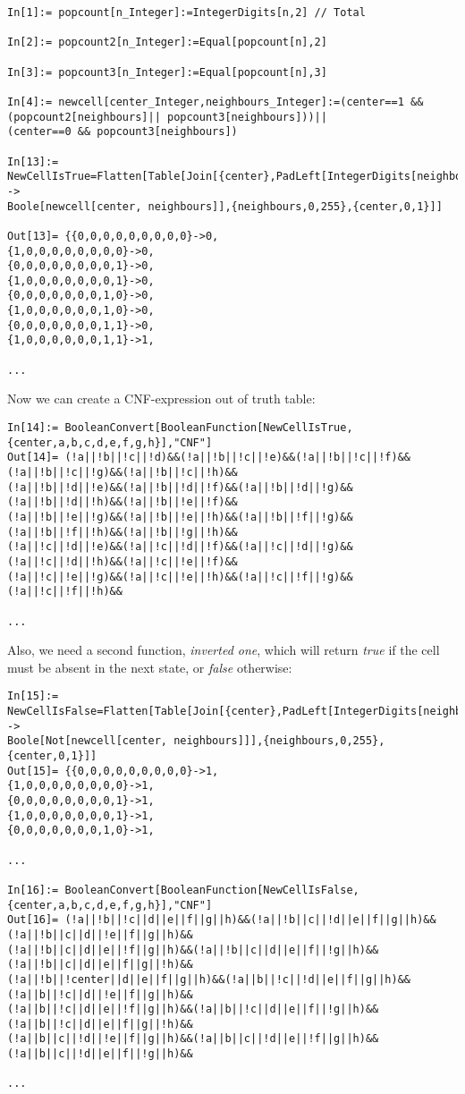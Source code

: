 \begin{lstlisting}
In[1]:= popcount[n_Integer]:=IntegerDigits[n,2] // Total

In[2]:= popcount2[n_Integer]:=Equal[popcount[n],2]

In[3]:= popcount3[n_Integer]:=Equal[popcount[n],3]

In[4]:= newcell[center_Integer,neighbours_Integer]:=(center==1 && (popcount2[neighbours]|| popcount3[neighbours]))||
(center==0 && popcount3[neighbours])

In[13]:= NewCellIsTrue=Flatten[Table[Join[{center},PadLeft[IntegerDigits[neighbours,2],8]] ->
Boole[newcell[center, neighbours]],{neighbours,0,255},{center,0,1}]]

Out[13]= {{0,0,0,0,0,0,0,0,0}->0,
{1,0,0,0,0,0,0,0,0}->0,
{0,0,0,0,0,0,0,0,1}->0,
{1,0,0,0,0,0,0,0,1}->0,
{0,0,0,0,0,0,0,1,0}->0,
{1,0,0,0,0,0,0,1,0}->0,
{0,0,0,0,0,0,0,1,1}->0,
{1,0,0,0,0,0,0,1,1}->1,

...

\end{lstlisting}

Now we can create a \ac{CNF}-expression out of truth table:

\begin{lstlisting}
In[14]:= BooleanConvert[BooleanFunction[NewCellIsTrue,{center,a,b,c,d,e,f,g,h}],"CNF"]
Out[14]= (!a||!b||!c||!d)&&(!a||!b||!c||!e)&&(!a||!b||!c||!f)&&(!a||!b||!c||!g)&&(!a||!b||!c||!h)&&
(!a||!b||!d||!e)&&(!a||!b||!d||!f)&&(!a||!b||!d||!g)&&(!a||!b||!d||!h)&&(!a||!b||!e||!f)&&
(!a||!b||!e||!g)&&(!a||!b||!e||!h)&&(!a||!b||!f||!g)&&(!a||!b||!f||!h)&&(!a||!b||!g||!h)&&
(!a||!c||!d||!e)&&(!a||!c||!d||!f)&&(!a||!c||!d||!g)&&(!a||!c||!d||!h)&&(!a||!c||!e||!f)&&
(!a||!c||!e||!g)&&(!a||!c||!e||!h)&&(!a||!c||!f||!g)&&(!a||!c||!f||!h)&&

...

\end{lstlisting}

Also, we need a second function, \textit{inverted one}, which will return \textit{true}
if the cell must be absent in the next state, or \textit{false} otherwise:

\begin{lstlisting}
In[15]:= NewCellIsFalse=Flatten[Table[Join[{center},PadLeft[IntegerDigits[neighbours,2],8]] ->
Boole[Not[newcell[center, neighbours]]],{neighbours,0,255},{center,0,1}]]
Out[15]= {{0,0,0,0,0,0,0,0,0}->1,
{1,0,0,0,0,0,0,0,0}->1,
{0,0,0,0,0,0,0,0,1}->1,
{1,0,0,0,0,0,0,0,1}->1,
{0,0,0,0,0,0,0,1,0}->1,

...

In[16]:= BooleanConvert[BooleanFunction[NewCellIsFalse,{center,a,b,c,d,e,f,g,h}],"CNF"]
Out[16]= (!a||!b||!c||d||e||f||g||h)&&(!a||!b||c||!d||e||f||g||h)&&(!a||!b||c||d||!e||f||g||h)&&
(!a||!b||c||d||e||!f||g||h)&&(!a||!b||c||d||e||f||!g||h)&&(!a||!b||c||d||e||f||g||!h)&&
(!a||!b||!center||d||e||f||g||h)&&(!a||b||!c||!d||e||f||g||h)&&(!a||b||!c||d||!e||f||g||h)&&
(!a||b||!c||d||e||!f||g||h)&&(!a||b||!c||d||e||f||!g||h)&&(!a||b||!c||d||e||f||g||!h)&&
(!a||b||c||!d||!e||f||g||h)&&(!a||b||c||!d||e||!f||g||h)&&(!a||b||c||!d||e||f||!g||h)&&

...

\end{lstlisting}

